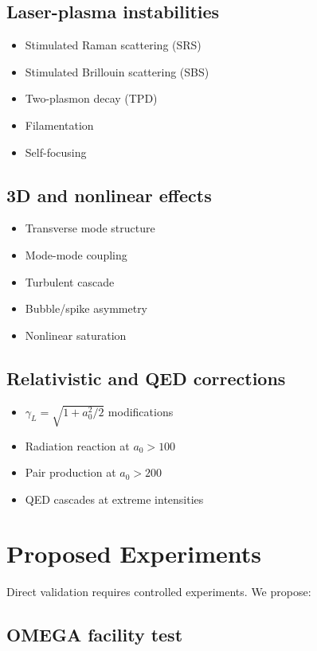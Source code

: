 \documentclass[aps,pre,twocolumn,showpacs,superscriptaddress]{revtex4-2}
\theoremstyle{definition}
\begin{document}
\subsection{Laser-plasma instabilities}
\begin{itemize}
\item Stimulated Raman scattering (SRS)
\item Stimulated Brillouin scattering (SBS)
\item Two-plasmon decay (TPD)
\item Filamentation
\item Self-focusing
\end{itemize}

\subsection{3D and nonlinear effects}
\begin{itemize}
\item Transverse mode structure
\item Mode-mode coupling
\item Turbulent cascade
\item Bubble/spike asymmetry
\item Nonlinear saturation
\end{itemize}

\subsection{Relativistic and QED corrections}
\begin{itemize}
\item $\gamma_L = \sqrt{1 + a_0^2/2}$ modifications
\item Radiation reaction at $a_0 > 100$
\item Pair production at $a_0 > 200$
\item QED cascades at extreme intensities
\end{itemize}

\section{Proposed Experiments}\label{sec:experiments}

Direct validation requires controlled experiments. We propose:

\subsection{OMEGA facility test}
\end{document}
